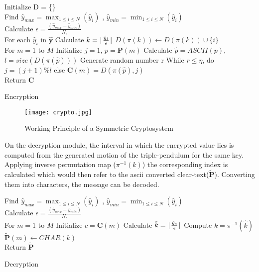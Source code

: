 \begin{algorithm}
Initialize D = \{\}\\
Find $\hat{y}_{max} = \max_{1 \leq i \leq N}(\hat{y}_{i})$ , $\hat{y}_{min}=\min_{1 \leq i \leq N}(\hat{y}_{i})$\\
Calculate $\epsilon = \frac{(\hat{y}_{max} - \hat{y}_{min})}{N_{c}}$\\
For each $\hat{y}_{i}$ in $\hat{\textbf{y}}$ \linebreak
 Calculate $k = \lfloor\frac{\hat{y}_{i}}{\epsilon}\rfloor$\linebreak
 $D(\pi(k)) \leftarrow D(\pi(k)) \cup \{i\}$\\
For $m = 1$ to $M$\linebreak
 Initialize $j = 1$, $p = \textbf{P}(m)$ \linebreak
 Calculate $\hat{p} = ASCII(p)$, $l = size(D(\pi(\hat{p})))$ \linebreak
 Generate random number r \linebreak
 While $r \leq \eta $, do $j=(j+1) \% l$ else  $ \textbf{C}(m) = D(\pi(\hat{p}), j)$\\
Return \textbf{C}
\caption{Encryption}
\label{algo:encrypt}
\end{algorithm}

\begin{figure}[H]
\centering
\texttt{[image: crypto.jpg]}
\caption{Working Principle of a Symmetric Cryptosystem}\label{fig:crypto}
\end{figure}

On the decryption module, the interval in which the encrypted value lies is computed from the generated motion of the triple-pendulum for the same key. Applying inverse permutation map ($\pi^{-1}(k)$) the corresponding index is calculated which would then refer to the ascii converted clear-text($\tilde{\textbf{P}}$). Converting them into characters, the message can be decoded.\\

\begin{algorithm}
\DontPrintSemicolon %
Find $\hat{y}_{max} = \max_{1 \leq i \leq N}(\hat{y}_{i})$ , $\hat{y}_{min}=\min_{1 \leq i \leq N}(\hat{y}_{i})$\\
Calculate $\epsilon = \frac{(\hat{y}_{max} - \hat{y}_{min})}{N_{c}}$\\
For $m = 1$ to $M$\linebreak
 Initialize $c = \textbf{C}(m)$ \linebreak
 Calculate $\hat{k} = \lfloor\frac{\hat{y}_{c}}{\epsilon}\rfloor$\linebreak 
 Compute $ k = \pi^{-1}(\hat{k})$\linebreak
 $\tilde{\textbf{P}}(m) \leftarrow CHAR(k)$\\
Return $\tilde{\textbf{P}}$
\caption{Decryption}
\label{algo:decrypt}
\end{algorithm}

